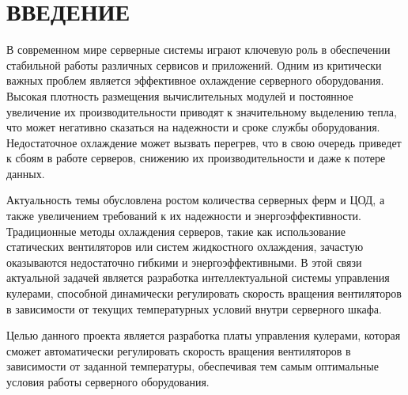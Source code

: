 \chapter*{ВВЕДЕНИЕ}

В современном мире серверные системы играют ключевую роль в обеспечении стабильной работы 
различных сервисов и приложений. Одним из критически важных проблем является эффективное 
охлаждение серверного оборудования. Высокая плотность размещения вычислительных модулей и 
постоянное увеличение их производительности приводят к значительному выделению тепла, что 
может негативно сказаться на надежности и сроке службы оборудования. Недостаточное охлаждение 
может вызвать перегрев, что в свою очередь приведет к сбоям в работе серверов, снижению их 
производительности и даже к потере данных.

Актуальность темы обусловлена ростом количества серверных ферм и ЦОД, а также увеличением требований к их надежности и энергоэффективности. Традиционные методы охлаждения серверов, такие как использование статических вентиляторов или систем жидкостного охлаждения, зачастую оказываются недостаточно гибкими и энергоэффективными. В этой связи актуальной задачей является разработка интеллектуальной системы управления кулерами, способной динамически регулировать скорость вращения вентиляторов в зависимости от текущих температурных условий внутри серверного шкафа.

Целью данного проекта является разработка платы управления кулерами, которая сможет автоматически регулировать скорость вращения вентиляторов в зависимости от заданной температуры, обеспечивая тем самым оптимальные условия работы серверного оборудования.